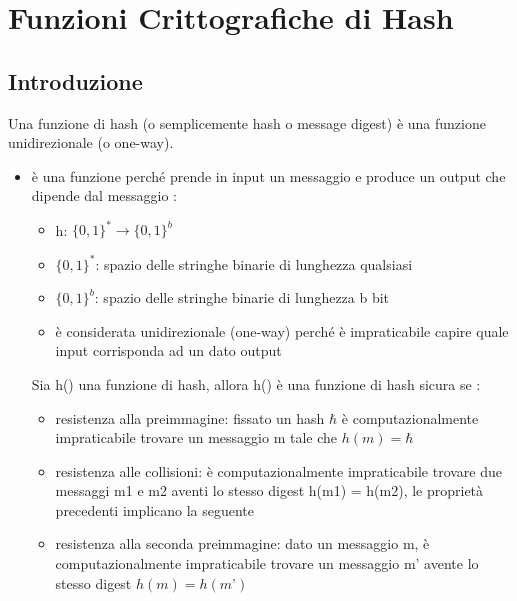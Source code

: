 \chapter{Funzioni Crittografiche di Hash}
\section{Introduzione}
Una funzione di hash (o semplicemente hash o message digest) è una funzione unidirezionale (o one-way).
\begin{itemize}
\item è una funzione perché prende in input un messaggio e produce un output che dipende dal messaggio :
	\begin{itemize}
	\item h: $\{0, 1\}^{*} \rightarrow \{0, 1\}^{b}$
	\item $\{0, 1\}^{*}$: spazio delle stringhe binarie di lunghezza qualsiasi
	\item $\{0, 1\}^{b}$: spazio delle stringhe binarie di lunghezza b bit
	\item è considerata unidirezionale (one-way) perché è impraticabile capire quale input corrisponda ad un dato output
	\end{itemize}

Sia h() una funzione di hash, allora h() è una funzione di hash sicura se :
	\begin{itemize}
	\item resistenza alla preimmagine: fissato un hash $\hbar$ è
	computazionalmente impraticabile trovare un messaggio
	m tale che $h(m) = \hbar$
	\item resistenza alle collisioni: è computazionalmente
	impraticabile trovare due messaggi m1 e m2 aventi lo
	stesso digest h(m1) = h(m2), le proprietà precedenti implicano la seguente
	\item resistenza alla seconda preimmagine: dato un messaggio
	m, è computazionalmente impraticabile trovare un
	messaggio m’ avente lo stesso digest $h(m) = h(m’)$
	\end{itemize}
\end{itemize}


